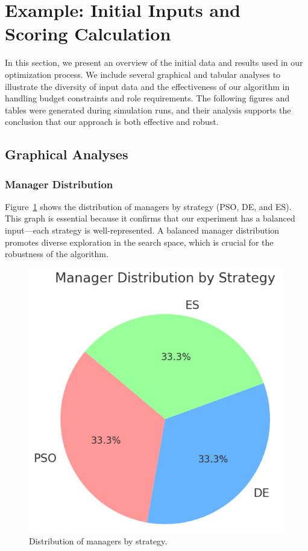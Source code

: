\documentclass[sigconf]{acmart}
\begin{document}
\section{Example: Initial Inputs and Scoring Calculation}

In this section, we present an overview of the initial data and results used in our optimization process. We include several graphical and tabular analyses to illustrate the diversity of input data and the effectiveness of our algorithm in handling budget constraints and role requirements. The following figures and tables were generated during simulation runs, and their analysis supports the conclusion that our approach is both effective and robust.

\subsection{Graphical Analyses}

\subsubsection{Manager Distribution}
Figure~\ref{fig:manager_distribution} shows the distribution of managers by strategy (PSO, DE, and ES). This graph is essential because it confirms that our experiment has a balanced input—each strategy is well-represented. A balanced manager distribution promotes diverse exploration in the search space, which is crucial for the robustness of the algorithm.

\begin{figure}[H]
	\centering
	\includegraphics[width=0.6\linewidth]{plot/manager_distribution.png}
	\caption{Distribution of managers by strategy.}
	\label{fig:manager_distribution}
\end{figure}
\end{document}
